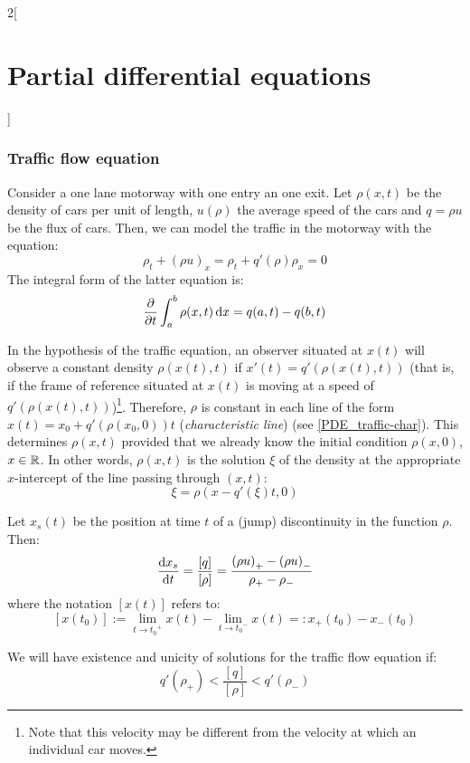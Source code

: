 \documentclass[../../../main_math.tex]{subfiles}
\begin{document}
\begin{multicols}{2}[\section{Partial differential equations}]
  \subsubsection{Traffic flow equation}
  \begin{proposition}
    Consider a one lane motorway with one entry an one exit. Let $\rho(x,t)$ be the density of cars per unit of length, $u(\rho)$ the average speed of the cars and $q=\rho u$ be the flux of cars. Then, we can model the traffic in the motorway with the equation: $$\rho_t+{(\rho u)}_x=\rho_t+q'(\rho){\rho}_x=0$$
    The integral form of the latter equation is: $$\pdv{}{t}\int_{a}^b\rho(x,t)\dd{x}=q(a,t)-q(b,t)$$
  \end{proposition}
  \begin{proposition}
    In the hypothesis of the traffic equation, an observer situated at $x(t)$ will observe a constant density $\rho(x(t),t)$ if $x'(t)=q'(\rho(x(t),t))$ (that is, if the frame of reference situated at $x(t)$ is moving at a speed of $q'(\rho(x(t),t))$)\footnote{Note that this
      velocity may be different from the velocity at which an individual car moves.}. Therefore, $\rho$ is constant in each line of the form $x(t)=x_0+q'(\rho(x_0,0))t$ (\emph{characteristic line}) (see \cref{PDE_traffic-char}). This determines $\rho(x,t)$ provided that we already know the initial condition $\rho(x,0)$, $x\in\mathbb{R}$. In other words, $\rho(x,t)$ is the solution $\xi$ of the density at the appropriate $x$-intercept of the line passing through $(x,t)$: $$\xi=\rho(x-q'(\xi)t,0)$$
  \end{proposition}
  \begin{center}
    \begin{minipage}{\linewidth}
      \centering
      
      \label{PDE_traffic-char}
    \end{minipage}
  \end{center}
  \begin{proposition}
    Let $x_s(t)$ be the position at time $t$ of a (jump) discontinuity in the function $\rho$. Then: $$\dv{x_s}{t}=\frac{[q]}{[\rho]}=\frac{{(\rho u)}_+-{(\rho u)}_-}{\rho_+-\rho_-}$$ where the notation $[x(t)]$ refers to: $$[x(t_0)]:=\lim_{t\to{t_0}^+}x(t)-\lim_{t\to{t_0}^-}x(t)=:x_+(t_0)-x_-(t_0)$$
  \end{proposition}
  \begin{lemma}
    We will have existence and unicity of solutions for the traffic flow equation if: $$q'(\rho_+)<\frac{[q]}{[\rho]}<q'(\rho_-)$$
  \end{lemma}

\end{multicols}
\end{document}
